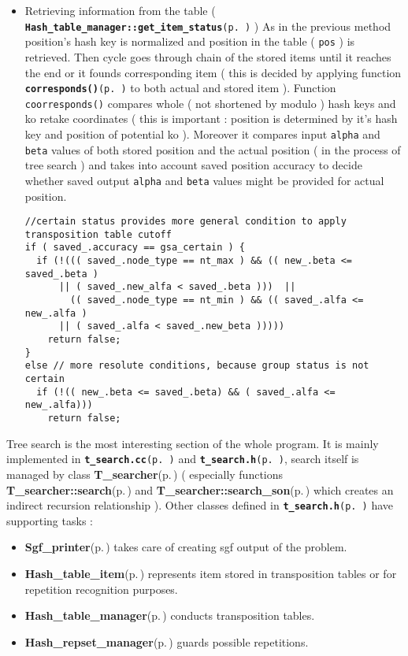 \begin{itemize}
\item Retrieving information from the table ( {\tt {\bf Hash\_\-table\_\-manager::get\_\-item\_\-status}{\rm (p.\,\pageref{classHash__table__manager_a6})}} ) As in the previous method position's hash key is normalized and position in the table ( {\tt pos} ) is retrieved. Then cycle goes through chain of the stored items until it reaches the end or it founds corresponding item ( this is decided by applying function {\tt {\bf corresponds()}{\rm (p.\,\pageref{t__search_8cc_a0})}} to both actual and stored item ). Function {\tt coorresponds()} compares whole ( not shortened by modulo ) hash keys and ko retake coordinates ( this is important : position is determined by it's hash key and position of potential ko ). Moreover it compares input {\tt alpha} and {\tt beta} values of both stored position and the actual position ( in the process of tree search ) and takes into account saved position accuracy to decide whether saved output {\tt alpha} and {\tt beta} values might be provided for actual position. 

\footnotesize\begin{verbatim}//certain status provides more general condition to apply transposition table cutoff
if ( saved_.accuracy == gsa_certain ) { 
  if (!((( saved_.node_type == nt_max ) && (( new_.beta <= saved_.beta ) 
      || ( saved_.new_alfa < saved_.beta )))  || 
        (( saved_.node_type == nt_min ) && (( saved_.alfa <= new_.alfa ) 
      || ( saved_.alfa < saved_.new_beta ))))) 
    return false;
} 
else // more resolute conditions, because group status is not certain 
  if (!(( new_.beta <= saved_.beta) && ( saved_.alfa <= new_.alfa))) 
    return false;
\end{verbatim}
\normalsize
\end{itemize}


Tree search is the most interesting section of the whole program. It is mainly implemented in {\tt {\bf t\_\-search.cc}{\rm (p.\,\pageref{t__search_8cc})}} and {\tt {\bf t\_\-search.h}{\rm (p.\,\pageref{t__search_8h})}}, search itself is managed by class {\bf T\_\-searcher}{\rm (p.\,\pageref{classT__searcher})} ( especially functions {\bf T\_\-searcher::search}{\rm (p.\,\pageref{classT__searcher_a0})} and {\bf T\_\-searcher::search\_\-son}{\rm (p.\,\pageref{classT__searcher_a11})} which creates an indirect recursion relationship ). Other classes defined in {\tt {\bf t\_\-search.h}{\rm (p.\,\pageref{t__search_8h})}} have supporting tasks :\begin{itemize}
\item {\bf Sgf\_\-printer}{\rm (p.\,\pageref{classSgf__printer})} takes care of creating sgf output of the problem.\item {\bf Hash\_\-table\_\-item}{\rm (p.\,\pageref{classHash__table__item})} represents item stored in transposition tables or for repetition recognition purposes.\item {\bf Hash\_\-table\_\-manager}{\rm (p.\,\pageref{classHash__table__manager})} conducts transposition tables.\item {\bf Hash\_\-repset\_\-manager}{\rm (p.\,\pageref{classHash__repset__manager})} guards possible repetitions.\end{itemize}
